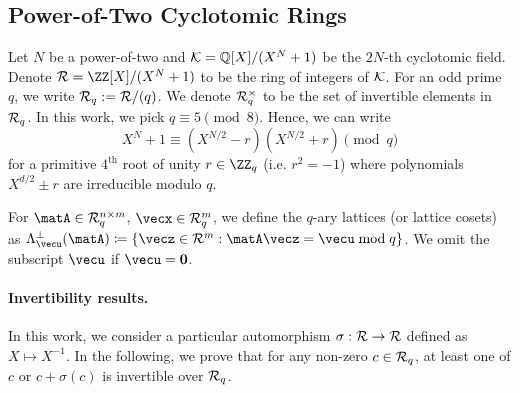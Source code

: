\documentclass[11pt,letterpaper]{article}
\theoremstyle{definition} %
\begin{document}
\subsection{Power-of-Two Cyclotomic Rings}\label{subsec:cyclrings}
Let $N$ be a power-of-two and $\mathcal{K} = \mathbb{Q}[X]/(X^N+1)$ be the $2N$-th cyclotomic field. Denote $\R =\ZZ[X]/(X^{N}+1)$ to be the ring of integers of $\mathcal{K}$. For an odd prime $q$, we write $\mathcal{R}_q := \mathcal{R}/(q)$. We denote $\mathcal{R}_q^\times$ to be the set of invertible elements in $\mathcal{R}_q$. In this work, we pick $q \equiv 5 \pmod{8}$. Hence, we can  write 
\[X^N + 1 \equiv (X^{N/2}-r)(X^{N/2}+r) \pmod{q}\]
for a primitive $4^{\text{th}}$ root of unity $r \in \ZZ_q$ (i.e. $r^2 = -1$) where polynomials $X^{d/2}\pm r$ are irreducible modulo $q$. 

For $\matA \in \Rq^{n \times m}$, $\vecx \in \Rq^{m}$, we define the $q$-ary lattices (or lattice cosets) as  $\Lattice_\vecu^\perp(\matA) \coloneqq \{ \vecz \in \R^m : \matA \vecz = \vecu \bmod q \}$. We omit the subscript $\vecu$ if $\vecu = \veczero$. 

\paragraph{Invertibility results.} In this work, we consider a particular automorphism $\sigma : \mathcal{R} \rightarrow \mathcal{R}$ defined as $X \mapsto X^{-1}$. In the following, we prove that for any non-zero $c \in \mathcal{R}_q$, at least one of $c$ or $c + \sigma(c)$ is invertible over $\mathcal{R}_q$.
\end{document}
